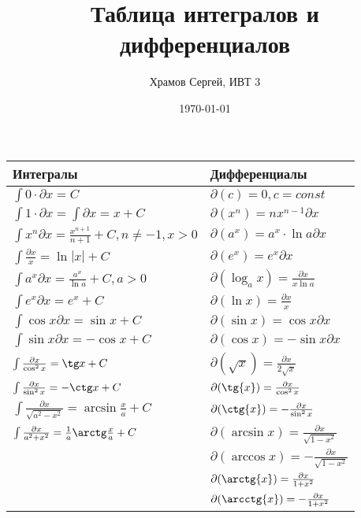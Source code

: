 \documentclass[a4paper,12pt]{article} %
\author{Храмов Сергей, ИВТ 3}
\title{Таблица интегралов и дифференциалов{}}
\date{\today}
\begin{document}
\maketitle
\begin{tabular}{ | l | l | }
\hline
Интегралы & Дифференциалы \\ \hline
$\int 0 \cdot \partial x =C$ & $\partial (c) = 0, c = const$ \\
$\int 1 \cdot \partial x = \int \partial x = x + C$ & $\partial (x^{n}) = nx^{n-1}\partial x$ \\ 
$\int x^{n} \partial x = \frac{x^{n + 1}}{n + 1} + C, n \neq -1, x>0$ & $\partial (a^{x}) = a^{x} \cdot \ln a \partial x$ \\
$\int \frac{\partial x}{x} = \ln|x| + C$&  $\partial (e^{x}) = e^{x}\partial x$ \\
$\int a^{x} \partial x = \frac{a^{x}}{\ln a} + C, a > 0$ &  $\partial (\log_{a}x) = \frac{\partial x}{x\ln a}$ \\
$\int e^{x} \partial x = e^{x} + C  $ & $\partial (\ln x) = \frac{\partial x}{x}$\\
$\int \cos x \partial x = \sin x + C  $ & $\partial (\sin x) = \cos x \partial x$ \\
$\int \sin x \partial x = -\cos x + C  $ & $\partial (\cos x) = - \sin x \partial x$\\
$\int \frac{\partial x}{\cos^{2}x} = \tg x + C  $ & $\partial (\sqrt{x}) = \frac{\partial x}{2\sqrt{x}}$\\
$\int \frac{\partial x}{\sin^{2}x} = -\ctg x + C  $ & $\partial (\tg{x}) = \frac{\partial x}{\cos^{2} x}$\\
$\int \frac{\partial x}{\sqrt{a^2 - x^{2}}} = \arcsin \frac{x}{a} + C $ & $\partial (\ctg{x}) = - \frac{\partial x}{\sin^{2} x}$\\
$\int \frac{\partial x}{{a^2 + x^{2}}} = \frac{1}{a}\arctg \frac{x}{a} + C  $ & $\partial (\arcsin{x}) = \frac{\partial x}{\sqrt{1 - x^{2}}}$\\
& $\partial (\arccos{x}) = - \frac{\partial x}{\sqrt{1 - x^{2}}}$\\
& $\partial (\arctg{x}) = \frac{\partial x}{1 + x^{2}}$\\
& $\partial (\arcctg{x}) = - \frac{\partial x}{1 + x^{2}}$\\



\hline

\end{tabular}
\end{document}
